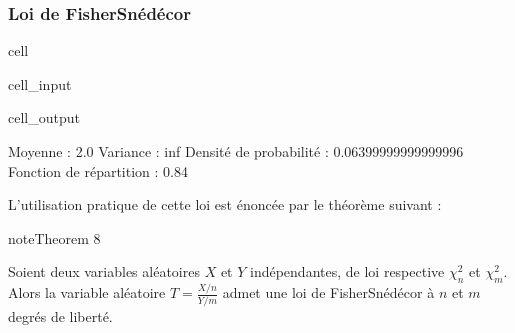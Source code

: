 \documentclass[letterpaper,10pt,french]{sphinxmanual}
\begin{document}
\subsubsection{Loi de Fisher\sphinxhyphen{}Snédécor}
\label{\detokenize{elemstats:loi-de-fisher-snedecor}}
\begin{sphinxuseclass}{cell}
\begin{sphinxuseclass}{cell_input}
\begin{sphinxVerbatim}[commandchars=\\\{\}]
   
  
    
  
 
 
 
\end{sphinxVerbatim}

\end{sphinxuseclass}
\begin{sphinxuseclass}{cell_output}
\begin{sphinxVerbatim}[commandchars=\\\{\}]
Moyenne :  2.0
Variance :  inf
Densité de probabilité :  0.06399999999999996
Fonction de répartition :  0.84
\end{sphinxVerbatim}

\end{sphinxuseclass}
\end{sphinxuseclass}
\sphinxAtStartPar
L’utilisation pratique de cette loi est énoncée par le théorème suivant :
\label{elemstats:theorem-14}
\begin{sphinxadmonition}{note}{Theorem 8}



\sphinxAtStartPar
Soient deux variables aléatoires \(X\) et \(Y\) indépendantes, de loi respective \(\chi_n^2\) et \(\chi_m^2\). Alors la variable aléatoire \(T=\frac{X/n}{Y/m}\) admet une loi de Fisher\sphinxhyphen{}Snédécor à \(n\) et \(m\) degrés de liberté.
\end{sphinxadmonition}
\end{document}
